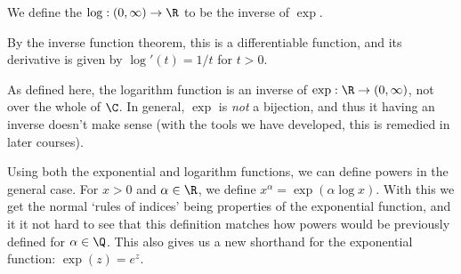 \documentclass[a4paper]{scrartcl}
\begin{document}
\begin{definition}
	We define the  $\log : (0, \infty) \rightarrow \R$ to be the inverse of $\exp$.
\end{definition}

By the inverse function theorem, this is a differentiable function, and its derivative is given by $\log'(t) = 1/t$ for $t > 0$.

\begin{remark}As defined here, the logarithm function is an inverse of $\exp: \R \rightarrow (0, \infty)$, not over the whole of $\C$. In general, $\exp$ is \emph{not} a bijection, and thus it having an inverse doesn't make sense (with the tools we have developed, this is remedied in later courses).
\end{remark}

Using both the exponential and logarithm functions, we can define powers in the general case. For $x > 0$ and $\alpha \in \R$, we define $x^\alpha = \exp(\alpha \log x)$. With this we get the normal `rules of indices' being properties of the exponential function, and it it not hard to see that this definition matches how powers would be previously defined for $\alpha \in \Q$. This also gives us a new shorthand for the exponential function: $\exp(z) = e^z$.
\end{document}
